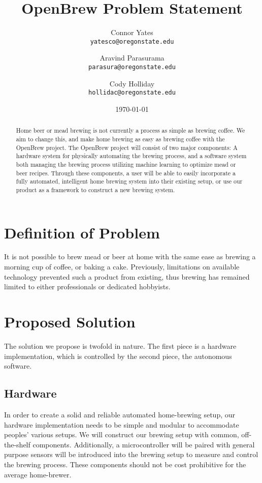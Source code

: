 \documentclass[letterpaper,10pt]{article}
\author{Connor Yates\\
\texttt{yatesco@oregonstate.edu}
\and
Aravind Parasurama\\
\texttt{parasura@oregonstate.edu}
\and
Cody Holliday\\
\texttt{hollidac@oregonstate.edu}}
\date{\today}
\title{OpenBrew Problem Statement}
\begin{document}
\maketitle

\begin{abstract}
	Home beer or mead brewing is not currently a process as simple as brewing
	coffee. We aim to change this, and make home brewing as easy as brewing coffee with the
	OpenBrew project. The OpenBrew project will consist of two major components: A
	hardware system for physically automating the brewing process, and a software system 
	both managing the brewing process utilizing machine learning to optimize mead or beer 
	recipes. Through these components, a user will be able to easily incorporate a fully 
	automated, intelligent home brewing system into their existing setup, or use our 
	product as a framework to construct a new brewing system.
\end{abstract}

\newpage

\section{Definition of Problem}
It is not possible to brew mead or beer at home with the same ease as brewing a morning cup of
coffee, or baking a cake. Previously, limitations on available technology prevented such
a product from existing, thus brewing has remained limited to either professionals or
dedicated hobbyists.

\section{Proposed Solution}
The solution we propose is twofold in nature.
The first piece is a hardware implementation, which is controlled by the second piece, 
the autonomous software.

\subsection{Hardware}
In order to create a solid and reliable automated home-brewing setup, our hardware 
implementation needs to be simple and modular to accommodate peoples' various setups.
We will construct our brewing setup with common, off-the-shelf components.
Additionally, a microcontroller will be paired with general purpose sensors will be 
introduced into the brewing setup to measure and control the brewing process.
These components should not be cost prohibitive for the average home-brewer.
\end{document}

